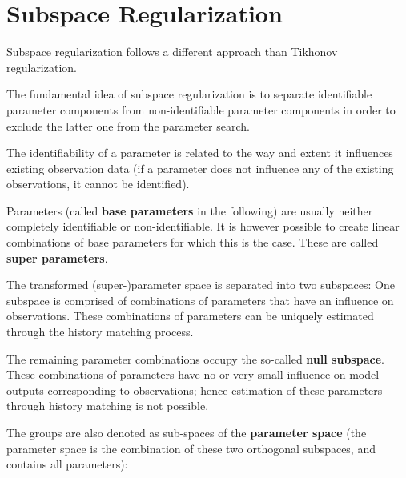 



\section{Subspace Regularization}
\label{sec:fepest:SubSpaceReg}

Subspace regularization follows a different approach than Tikhonov regularization.

The fundamental idea of subspace regularization is to separate identifiable parameter components from non-identifiable parameter components in order to exclude the latter one from the parameter search. 

The identifiability of a parameter is related to the way and extent it influences existing observation data (if a parameter does not influence any of the existing observations, it cannot be identified).

Parameters (called \textbf{base parameters} in the following) are usually neither completely identifiable or non-identifiable. It is however possible to create linear combinations of base parameters for which this is the case. These are called \textbf{super parameters}.

The transformed (super-)parameter space is separated into two subspaces: One subspace is comprised of combinations of parameters that have an influence on observations. These combinations of parameters can be uniquely estimated through the history matching process.

The remaining parameter combinations occupy the so-called \textbf{null subspace}. These combinations of parameters have no or very small influence on model outputs corresponding to observations; hence estimation of these parameters through history matching is not possible.

The groups are also denoted as sub-spaces of the \textbf{parameter space} (the parameter space is the combination of these two orthogonal subspaces, and contains all parameters):

